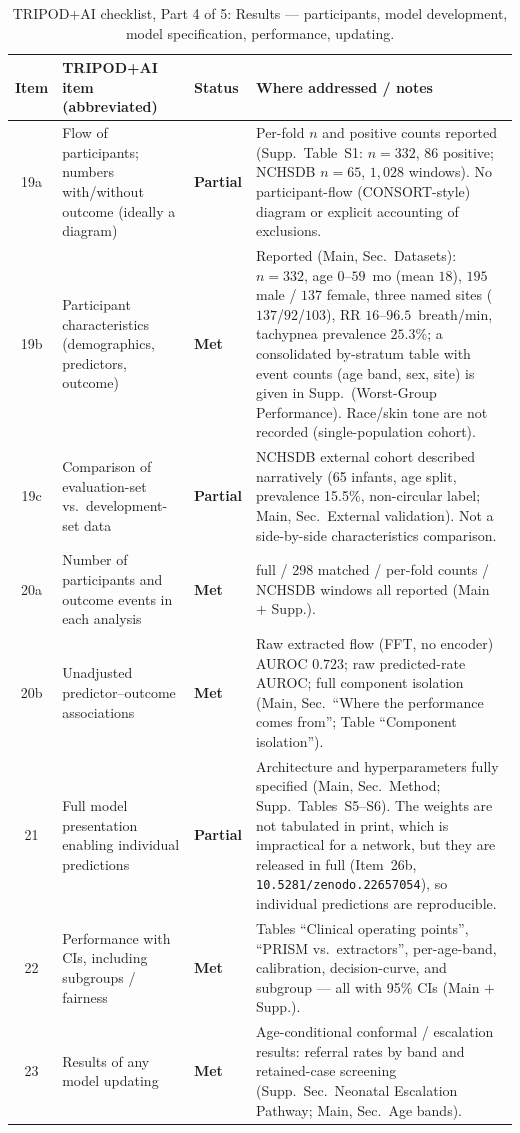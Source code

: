\begin{table}[!tp]
\caption{TRIPOD+AI checklist, Part 4 of 5: Results --- participants, model development, model specification,
performance, updating.}
\label{tab:tripod-d}\centering\footnotesize
\begin{tabular}{@{}c >{\raggedright\arraybackslash}p{1.65in} >{\raggedright\arraybackslash}p{0.70in} >{\raggedright\arraybackslash}p{3.35in}@{}}
\toprule
Item & TRIPOD+AI item (abbreviated) & Status & Where addressed / notes\\\midrule
19a & Flow of participants; numbers with/without outcome (ideally a diagram)
    & \textbf{Partial}
    & Per-fold $n$ and positive counts reported (Supp.~Table~S1: $n{=}332$, 86 positive; NCHSDB $n{=}65$, $1{,}028$ windows). No participant-flow (CONSORT-style) diagram or explicit accounting of exclusions.\\
19b & Participant characteristics (demographics, predictors, outcome)
    & \textbf{Met}
    & Reported (Main, Sec.~Datasets): $n{=}332$, age $0$--$59$~mo (mean $18$), $195$ male / $137$ female,
three named sites ($137$/$92$/$103$), RR $16$--$96.5$~breath/min, tachypnea prevalence $25.3\%$; a
consolidated by-stratum table with event counts (age band, sex, site) is given in Supp.~(Worst-Group
Performance). Race/skin tone are not recorded (single-population cohort).\\
19c & Comparison of evaluation-set vs.\ development-set data
    & \textbf{Partial}
    & NCHSDB external cohort described narratively (65 infants, age split, prevalence 15.5\%, non-circular label; Main, Sec.~External validation). Not a side-by-side characteristics comparison.\\
20a & Number of participants and outcome events in each analysis
    & \textbf{Met}
    & 332 full / 298 matched / per-fold counts / NCHSDB windows all reported (Main $+$ Supp.).\\
20b & Unadjusted predictor--outcome associations
    & \textbf{Met}
    & Raw extracted flow (FFT, no encoder) AUROC $0.723$; raw predicted-rate AUROC; full component isolation (Main, Sec.~``Where the performance comes from''; Table ``Component isolation'').\\
21  & Full model presentation enabling individual predictions
    & \textbf{Partial}
    & Architecture and hyperparameters fully specified (Main, Sec.~Method; Supp.~Tables~S5--S6). The
weights are not tabulated in print, which is impractical for a network, but they are released in
full (Item~26b, \texttt{10.5281/zenodo.22657054}), so individual predictions are reproducible.\\
22  & Performance with CIs, including subgroups / fairness
    & \textbf{Met}
    & Tables ``Clinical operating points'', ``PRISM vs.\ extractors'', per-age-band, calibration, decision-curve, and subgroup --- all with 95\% CIs (Main $+$ Supp.).\\
23  & Results of any model updating
    & \textbf{Met}
    & Age-conditional conformal / escalation results: referral rates by band and retained-case screening (Supp.~Sec.~Neonatal Escalation Pathway; Main, Sec.~Age bands).\\
\bottomrule
\end{tabular}
\end{table}

